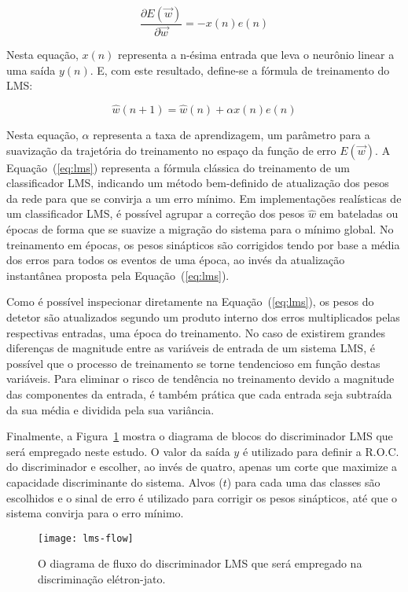\begin{equation}
\frac{\partial E(\overrightarrow{w})}{\partial \overrightarrow{w}} =
-x(n)e(n) 
\end{equation}

Nesta equação, $x(n)$ representa a n-ésima entrada que leva o neurônio linear
a uma saída $y(n)$. E, com este resultado, define-se a fórmula de treinamento
do LMS:

\begin{equation}
\hat{w}(n+1) = \hat{w}(n) + \alpha x(n)e(n)
\label{eq:lms}
\end{equation}

Nesta equação, $\alpha$ representa a taxa de aprendizagem, um parâmetro para a
suavização da trajetória do treinamento no espaço da função de erro
$E(\overrightarrow{w})$. A Equação~(\ref{eq:lms}) representa a fórmula
clássica do treinamento de um classificador LMS, indicando um método
bem-definido de atualização dos pesos da rede para que se convirja a um erro
mínimo. Em implementações realísticas de um classificador LMS, é possível
agrupar a correção dos pesos $\hat{w}$ em bateladas ou épocas de forma que se
suavize a migração do sistema para o mínimo global. No treinamento em épocas,
os pesos sinápticos são corrigidos tendo por base a média dos erros para todos
os eventos de uma época, ao invés da atualização instantânea proposta pela
Equação~(\ref{eq:lms}).

Como é possível inspecionar diretamente na Equação~(\ref{eq:lms}), os pesos do
detetor são atualizados segundo um produto interno dos erros multiplicados
pelas respectivas entradas, uma época do treinamento. No caso de existirem
grandes diferenças de magnitude entre as variáveis de entrada de um sistema
LMS, é possível que o processo de treinamento se torne tendencioso em função
destas variáveis. Para eliminar o risco de tendência no treinamento devido a
magnitude das componentes da entrada, é também prática que cada entrada seja
subtraída da sua média e dividida pela sua variância.

Finalmente, a Figura~\ref{fig:lms-flow} mostra o diagrama de blocos do
discriminador LMS que será empregado neste estudo. O valor da saída $y$ é
utilizado para definir a R.O.C. do discriminador e escolher, ao invés de
quatro, apenas um corte que maximize a capacidade discriminante do
sistema. Alvos ($t$) para cada uma das classes são escolhidos e o sinal de
erro é utilizado para corrigir os pesos sinápticos, até que o sistema convirja
para o erro mínimo.

\begin{figure}
\begin{center}
\texttt{[image: lms-flow]}
\end{center}
\caption{O diagrama de fluxo do discriminador LMS que será empregado na
discriminação elétron-jato.}
\label{fig:lms-flow}
\end{figure}

